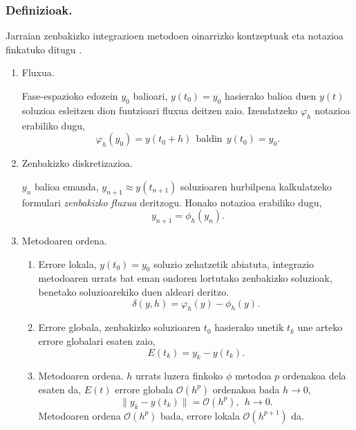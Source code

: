 \subsubsection*{Definizioak.}  
Jarraian zenbakizko integrazioen metodoen oinarrizko kontzeptuak eta notazioa finkatuko ditugu \cite{Corless2013,Hairer2006}.
\begin{enumerate}
\item Fluxua.

Fase-espazioko edozein $y_0$ balioari, $y(t_0)=y_0$ hasierako balioa duen $y(t)$ soluzioa esleitzen dion funtzioari fluxua deitzen zaio. Izendatzeko $\varphi_h$ notazioa erabiliko dugu,
\begin{equation*}
\label{eq:fluxua}
\varphi_h(y_0)=y(t_0+h) \ \ \mbox{baldin}  \ \  y(t_0)=y_0.
\end{equation*}

\item Zenbakizko diskretizazioa.

$y_{n}$ balioa emanda, $y_{n+1}\approx y(t_{n+1})$ soluzioaren hurbilpena kalkulatzeko formulari \emph{zenbakizko fluxua} deritzogu. Honako notazioa erabiliko dugu,
\begin{equation}
\label{eq:204}
y_{n+1}=\phi_h(y_{n}).
\end{equation}

\item Metodoaren ordena.

\begin{enumerate}
\item Errore lokala,  $y(t_0)=y_0$ soluzio zehatzetik abiatuta, integrazio metodoaren urrats bat eman ondoren lortutako zenbakizko soluzioak, benetako soluzioarekiko duen aldeari deritzo.
\begin{equation*}
\label{eq:le}
\delta(y,h)=\varphi_h(y)-\phi_h(y).
\end{equation*}   


\item Errore globala, zenbakizko soluzioaren $t_0$ hasierako unetik $t_k$ une arteko errore globalari esaten zaio,
\begin{equation*}
 \label{eq:ge}
E(t_k)=y_k-y(t_k).
\end{equation*}  

\item Metodoaren ordena. $h$ urrats luzera finkoko $\phi$ metodoa $p$ ordenakoa dela esaten da, $E(t)$ errore globala $\mathcal{O}(h^{p})$ ordenakoa bada  $h \rightarrow 0$,
\begin{equation*} 
\label{eq:metordena}
\|y_k-y(t_k)\|=\mathcal{O}(h^{p}), \ \ h \rightarrow 0.
\end{equation*} 
Metodoaren ordena $\mathcal{O}(h^p)$ bada, errore lokala $\mathcal{O}(h^{p+1})$ da.


\end{enumerate}
\end{enumerate}
